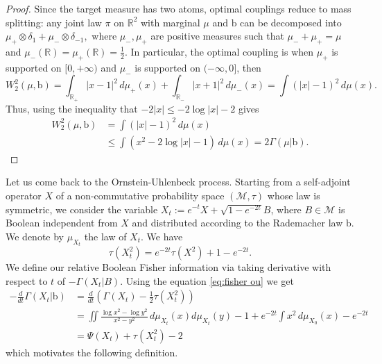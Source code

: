 \documentclass[10pt, reqno]{amsart}
\numberwithin{equation}{section}
\theoremstyle{definition}
\theoremstyle{plain}
\theoremstyle{remark}
\newcommand{\R}{\mathbb{R}}
\newcommand{\1}{\mathbbm{1}}
\begin{document}
	\begin{proof}
    Since the target measure has two atoms, optimal couplings reduce to mass splitting: any joint law $\pi$ on $\mathbb{R}^2$ with marginal $\mu$ and $\mathbb{\mathrm{b}}$ can be decomposed into $\mu_+\otimes \delta_1 + \mu_-\otimes \delta_{-1},$ where $\mu_-,\mu_+$ are positive measures such that $\mu_-+\mu_+=\mu$ and $\mu_-(\mathbb{R})=\mu_+(\mathbb{R})=\frac{1}{2}$. In particular, the optimal coupling is when $\mu_+$ is supported on $[0,+\infty)$ and $\mu_-$ is supported on $(-\infty,0]$, then
	     \begin{equation*}
		    W_2^2(\mu,\mathbb{\mathrm{b}}) =\int_{\R_+} |x-1|^2\,d\mu_+(x) + \int_{\R_-} |x+1|^2\,d\mu_-(x) = \int (|x|-1)^2\,d\mu(x).
	    \end{equation*}
        Thus, using the inequality that $-2|x| \leq -2\log |x| -2$ gives
	     \begin{align*}
		    W_2^2(\mu,\mathbb{\mathrm{b}})&= \int (|x|-1)^2\,d\mu(x)\\
		    &\leq \int (x^2 - 2\log |x| -1)\,d\mu(x) = 2\Gamma(\mu|\mathbb{\mathrm{b}}).
	    \end{align*}
	\end{proof}
    Let us come back to the Ornstein-Uhlenbeck process. Starting from a self-adjoint operator $X$ of a non-commutative probability space $(\mathcal{M},\tau)$ whose law is symmetric, we consider the variable $X_t:=e^{-t}X + \sqrt{1-e^{-2t}}B$, where $B\in \mathcal{M}$ is Boolean independent from $X$ and distributed according to the Rademacher law $\mathrm{b}.$ We denote by $\mu_{X_t}$ the law of $X_t$. We have
    $$\tau(X_t^2)=e^{-2t}\tau(X^2)+1-e^{-2t}.$$
We define our relative Boolean Fisher information via taking derivative with respect to $t$ of $-\Gamma(X_t|B)$. Using the equation \eqref{eq:fisher ou} we get
	\begin{align}\label{eq:rela fisher}
		-\frac{d}{dt}\Gamma(X_t|\mathbb{\mathrm{b}})\nonumber
		&=\frac{d}{dt}\left(\Gamma(X_t)-\frac{1}{2}\tau\left(X_t^2\right)\right)\\
        &=\iint \frac{\log x^2-\log y^2}{x^2-y^2}\,d\mu_{X_t}(x)d\mu_{X_t}(y) -1 + e^{-2t}\int x^2 \,d\mu_{X_0}(x) - e^{-2t}\nonumber \\
		&= \Psi(X_t) + \tau(X_t^2) - 2
	\end{align}
    which motivates the following definition.
\end{document}
